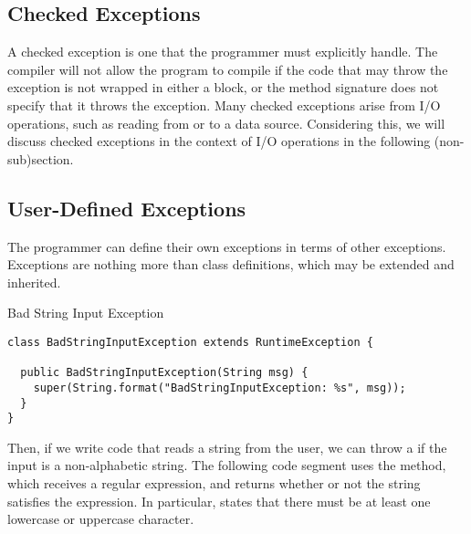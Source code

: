 \subsection*{Checked Exceptions}

A checked exception is one that the programmer must explicitly handle. The compiler will not allow the program to compile if the code that may throw the exception is not wrapped in either a  block, or the method signature does not specify that it throws the exception. Many checked exceptions arise from I/O operations, such as reading from or to a data source. Considering this, we will discuss checked exceptions in the context of I/O operations in the following (non-sub)section.

\subsection*{User-Defined Exceptions}
The programmer can define their own exceptions in terms of other exceptions. Exceptions are nothing more than class definitions, which may be extended and inherited. 


\begin{cl}[]{Bad String Input Exception}
\begin{lstlisting}[language=MyJava]
class BadStringInputException extends RuntimeException {
  
  public BadStringInputException(String msg) {
    super(String.format("BadStringInputException: %s", msg));
  }
}
\end{lstlisting}
\end{cl}

Then, if we write code that reads a string from the user, we can throw a  if the input is a non-alphabetic string. The following code segment uses the  method, which receives a regular expression, and returns whether or not the string satisfies the expression. In particular, \ttt{[a-zA-Z]+} states that there must be at least one lowercase or uppercase character.

